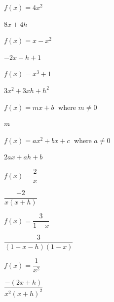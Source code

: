 \documentclass{ximera}
\begin{document}
\begin{question}
\begin{problem}
$f(x) = 4x^2$   

\begin{solution}
    $8x+4h$
\end{solution}
\end{problem}

\begin{problem}
$f(x) = x-x^2$

\begin{solution}
$-2x-h+1$
\end{solution}
\end{problem} 

\begin{problem}
$f(x) = x^{3} + 1$

\begin{solution}
    $3x^{2} + 3xh + h^{2}$
\end{solution}
\end{problem}  

\begin{problem}
$f(x) = mx + b\;$ where $m \neq 0$

\begin{solution}
    $m$
\end{solution}
\end{problem} 

\begin{problem}
$f(x) = ax^{2} + bx + c\;$ where $a \neq 0$

\begin{solution}
    $2ax + ah + b$
\end{solution}
\end{problem}  

\begin{problem}
$f(x) = \dfrac{2}{x}$

\begin{solution}
    $\dfrac{-2}{x(x+h)}$
\end{solution}
\end{problem} 

\begin{problem}
$f(x) = \dfrac{3}{1-x}$

\begin{solution}
    $\dfrac{3}{(1-x-h)(1-x)}$
\end{solution}
\end{problem}

\begin{problem}
$f(x) = \dfrac{1}{x^2}$

\begin{solution}
$\dfrac{-(2x+h)}{x^2(x+h)^2}$
\end{solution}
\end{problem}  


\end{question}
\end{document}
